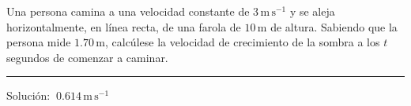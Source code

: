 \vspace{1cm}
\begin{mipropuesto}

Una persona camina a una velocidad constante de $3\, \mathrm{m\, s}^{-1}$ y se aleja horizontalmente, en línea recta, de una farola de $10\, \mathrm{m}$ de altura. Sabiendo que la persona mide $1.70\, \mathrm{m}$, calcúlese la velocidad de crecimiento de la sombra a los $t$ segundos de comenzar a caminar.

\color{olive}
\rule{200pt}{0.2pt}
\color{black}


\begin{flushright}
		 Solución: $\  0.614\,  \mathrm{m\, s}^{-1}$
\end{flushright}

\end{mipropuesto}




